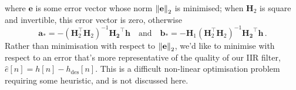 %
where $\mathbf{e}$ is some error vector whose norm $\left\lVert\mathbf{e}\right\rVert_2$
is minimised; when $\mathbf{H}_2$ is square and invertible, this
error vector is zero, otherwise
%
\begin{displaymath}
  \mathbf{a}_* = -\left(\mathbf{H}_2^\top\mathbf{H}_2\right)^{-1}\mathbf{H_2}^\top\mathbf{h}
  \quad\mathrm{and}\quad
  \mathbf{b}_* = -\mathbf{H}_1\left(\mathbf{H}_2^\top\mathbf{H}_2\right)^{-1}\mathbf{H_2}^\top\mathbf{h} \,.
\end{displaymath}
%
Rather than minimisation with respect to $\left\lVert\mathbf{e}\right\rVert_2$, we'd like
to minimise with respect to an error that's more representative of
the quality of our IIR filter, $\hat{e}[n] = h[n] - h_\mathrm{des}[n]$.
This is a difficult non-linear optimisation problem requiring some
heuristic, and is not discussed here.

